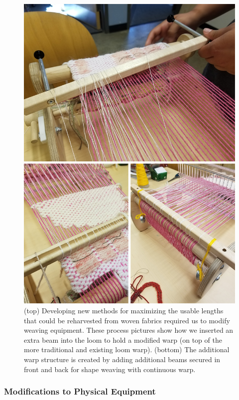 \begin{figure}[ht]
    \centering
    \includegraphics[width=0.8\linewidth]{figs/UF_loommod.png}
    \caption[Development of loom modifications for weaving unravel-able fabrics.]{(top) Developing new methods for maximizing the usable lengths that could be reharvested from woven fabrics required us to modify weaving equipment. These process pictures show how we inserted an extra beam into the loom to hold a modified warp (on top of the more traditional and existing loom warp). (bottom) The additional warp structure is created by adding additional beams secured in front and back for shape weaving with continuous warp.}
    \label{fig:loomMod}
\end{figure}

\subsubsection{Modifications to Physical Equipment}

